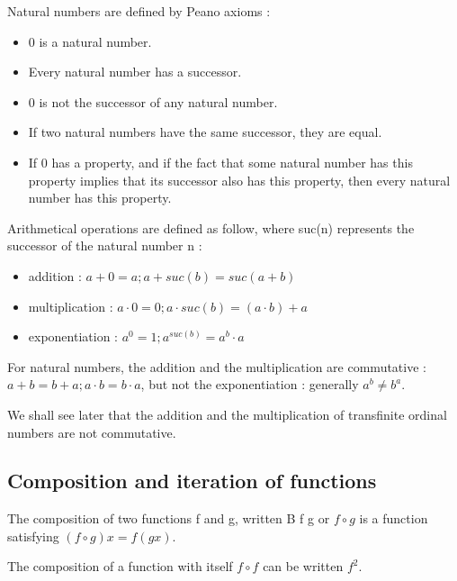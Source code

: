 \documentclass[10pt]{article}
\begin{document}
Natural numbers are defined by Peano axioms :

\begin{itemize}
     \setlength{\itemsep}{1pt}
     \setlength{\parskip}{0pt}
     \setlength{\parsep}{0pt}

\item 0 is a natural number.
\item Every natural number has a successor.
\item 0 is not the successor of any natural number.
\item If two natural numbers have the same successor, they are equal.
\item If 0 has a property, and if the fact that some natural number has this property implies that its successor also has this property, then every natural number has this property.

\end{itemize}

Arithmetical operations are defined as follow, where suc(n) represents the successor of the natural number n :

\begin{itemize}
     \setlength{\itemsep}{1pt}
     \setlength{\parskip}{0pt}
     \setlength{\parsep}{0pt}
\item addition : \( a+0=a ; a+suc(b)=suc(a+b) \)
\item multiplication : \( a \cdot 0 = 0 ; a \cdot suc(b) = (a \cdot b) + a \)
\item exponentiation : \( a^0 = 1 ; a^{suc(b)} = a^b \cdot a  \)
\end{itemize}

For natural numbers, the addition and the multiplication are commutative : \( a+b = b+a ; a \cdot b = b \cdot a \), but not the exponentiation : generally \( a^b \neq b^a \).

We shall see later that the addition and the multiplication of transfinite ordinal numbers are not commutative.

\subsection{Composition and iteration of functions}

The composition of two functions f and g, written B f g or \( f \circ g \) is a function satisfying \( (f \circ g) x = f (g x) \).

The composition of a function with itself \( f \circ f \) can be written \( f^2 \).
\end{document}

